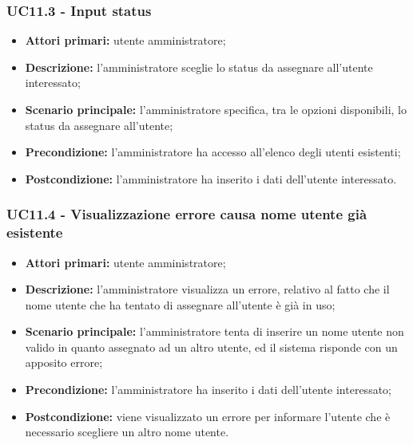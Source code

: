 \subsubsection{UC11.3 - Input status}
\begin{itemize}
	\item \textbf{Attori primari:} utente amministratore;
	\item \textbf{Descrizione:} l'amministratore sceglie lo status da assegnare all'utente interessato;
	\item \textbf{Scenario principale:} l'amministratore specifica, tra le opzioni disponibili, lo status da assegnare all'utente;
	\item \textbf{Precondizione:} l'amministratore ha accesso all'elenco degli utenti esistenti;
	\item \textbf{Postcondizione:} l'amministratore ha inserito i dati dell'utente interessato.
\end{itemize}

\subsubsection{UC11.4 - Visualizzazione errore causa nome utente già esistente}
	\begin{itemize}
		\item \textbf{Attori primari:} utente amministratore;
		\item \textbf{Descrizione:} l'amministratore visualizza un errore, relativo al fatto che il nome utente che ha tentato di assegnare all'utente è già in uso;
		\item \textbf{Scenario principale:} l'amministratore tenta di inserire un nome utente non valido in quanto assegnato ad un altro utente, ed il sistema risponde con un apposito errore;
		\item \textbf{Precondizione:} l'amministratore ha inserito i dati dell'utente interessato;
		\item \textbf{Postcondizione:} viene visualizzato un errore per informare l'utente che è necessario scegliere un altro nome utente.
	\end{itemize}

